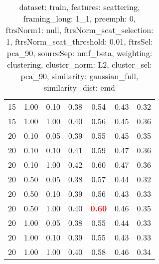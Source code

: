 \begin{table}
\begin{center}
\begin{tabular}{lllcccc}
15 & 1.00 & 0.10 & 0.38 & 0.54 & 0.43 & 0.32 \\ 
15 & 1.00 & 1.00 & 0.40 & 0.56 & 0.45 & 0.36 \\ 
20 & 0.10 & 0.05 & 0.39 & 0.55 & 0.45 & 0.35 \\ 
20 & 0.10 & 0.10 & 0.41 & 0.59 & 0.47 & 0.36 \\ 
20 & 0.10 & 1.00 & 0.42 & 0.60 & 0.47 & 0.36 \\ 
20 & 0.50 & 0.05 & 0.38 & 0.57 & 0.44 & 0.32 \\ 
20 & 0.50 & 0.10 & 0.39 & 0.56 & 0.43 & 0.33 \\ 
20 & 0.50 & 1.00 & 0.40 & \textbf{\textcolor{red}{0.60}} & 0.46 & 0.35 \\ 
20 & 1.00 & 0.05 & 0.38 & 0.55 & 0.44 & 0.33 \\ 
20 & 1.00 & 0.10 & 0.39 & 0.55 & 0.43 & 0.33 \\ 
20 & 1.00 & 1.00 & 0.40 & 0.58 & 0.46 & 0.34 \\ 
\end{tabular} 
\end{center} 
\caption{dataset: train, features: scattering, framing\_long: 1\_1, preemph: 0, ftrsNorm1: null, ftrsNorm\_scat\_selection: 1, ftrsNorm\_scat\_threshold: 0.01, ftrsSel: pca\_90, sourceSep: nmf\_beta, weighting: clustering, cluster\_norm: L2, cluster\_sel: pca\_90, similarity: gaussian\_full, similarity\_dist: emd} 
\label{datasetrFeaturscFraminlong1_1Preemp0Ftrsnorm1nuFtrsnoscatselect1Ftrsnoscatthresh0.01Ftrsselpc90SourcesepnmbeWeightclClustenormL2Clusteselpc90SimilagafuSimiladistem} 
\end{table} 
 

